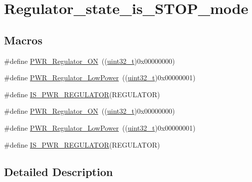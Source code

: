 \hypertarget{group___regulator__state__is___s_t_o_p__mode}{}\section{Regulator\+\_\+state\+\_\+is\+\_\+\+S\+T\+O\+P\+\_\+mode}
\label{group___regulator__state__is___s_t_o_p__mode}
\subsection*{Macros}
\begin{DoxyCompactItemize}
\item 
\#define \hyperlink{group___regulator__state__is___s_t_o_p__mode_gabf58b999bff6b4bf0fb5b97d74a75683}{P\+W\+R\+\_\+\+Regulator\+\_\+\+ON}~((\hyperlink{_p_e___types_8h_a33594304e786b158f3fb30289278f5af}{uint32\+\_\+t})0x00000000)
\item 
\#define \hyperlink{group___regulator__state__is___s_t_o_p__mode_ga13745136d094661358d373b67ebf1ac7}{P\+W\+R\+\_\+\+Regulator\+\_\+\+Low\+Power}~((\hyperlink{_p_e___types_8h_a33594304e786b158f3fb30289278f5af}{uint32\+\_\+t})0x00000001)
\item 
\#define \hyperlink{group___regulator__state__is___s_t_o_p__mode_ga03c105070272141c0bab5f2b74469072}{I\+S\+\_\+\+P\+W\+R\+\_\+\+R\+E\+G\+U\+L\+A\+T\+OR}(R\+E\+G\+U\+L\+A\+T\+OR)
\item 
\#define \hyperlink{group___regulator__state__is___s_t_o_p__mode_gabf58b999bff6b4bf0fb5b97d74a75683}{P\+W\+R\+\_\+\+Regulator\+\_\+\+ON}~((\hyperlink{_p_e___types_8h_a33594304e786b158f3fb30289278f5af}{uint32\+\_\+t})0x00000000)
\item 
\#define \hyperlink{group___regulator__state__is___s_t_o_p__mode_ga13745136d094661358d373b67ebf1ac7}{P\+W\+R\+\_\+\+Regulator\+\_\+\+Low\+Power}~((\hyperlink{_p_e___types_8h_a33594304e786b158f3fb30289278f5af}{uint32\+\_\+t})0x00000001)
\item 
\#define \hyperlink{group___regulator__state__is___s_t_o_p__mode_ga03c105070272141c0bab5f2b74469072}{I\+S\+\_\+\+P\+W\+R\+\_\+\+R\+E\+G\+U\+L\+A\+T\+OR}(R\+E\+G\+U\+L\+A\+T\+OR)
\end{DoxyCompactItemize}


\subsection{Detailed Description}


